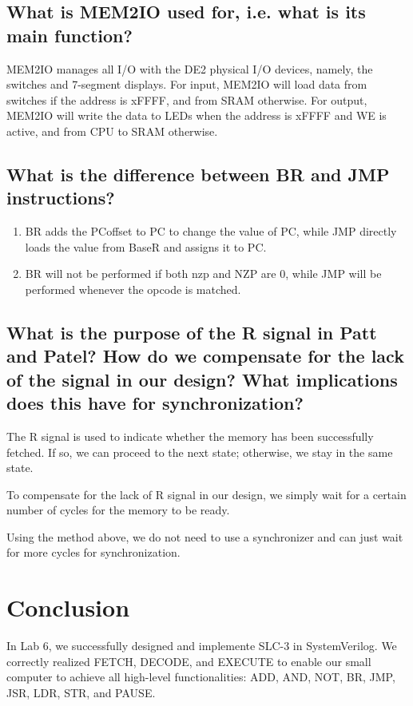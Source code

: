 \documentclass[11pt]{article}
\begin{document}
\subsection{What is MEM2IO used for, i.e. what is its main function?}
MEM2IO manages all I/O with the DE2 physical I/O devices, namely, the switches and 7-segment displays. For input, MEM2IO will load data from switches if the address is xFFFF, and from SRAM otherwise. For output, MEM2IO will write the data to LEDs when the address is xFFFF and WE is active, and from CPU to SRAM otherwise.

\subsection{What is the difference between BR and JMP instructions?}
\begin{enumerate}
    \item BR adds the PCoffset to PC to change the value of PC, while JMP directly loads the value from BaseR and assigns it to PC.
    \item BR will not be performed if both nzp and NZP are 0, while JMP will be performed whenever the opcode is matched.
\end{enumerate}

\subsection{What is the purpose of the R signal in Patt and Patel? How do we compensate for the lack of the signal in our design? What implications does this have for synchronization?}
The R signal is used to indicate whether the memory has been successfully fetched. If so, we can proceed to the next state; otherwise, we stay in the same state. 

To compensate for the lack of R signal in our design, we simply wait for a certain number of cycles for the memory to be ready.

Using the method above, we do not need to use a synchronizer and can just wait for more cycles for synchronization.

\section{Conclusion}
In Lab 6, we successfully designed and implemente SLC-3 in SystemVerilog. We correctly realized FETCH, DECODE, and EXECUTE to enable our small computer to achieve all high-level functionalities: ADD, AND, NOT, BR, JMP, JSR, LDR, STR, and PAUSE. 
\end{document}
